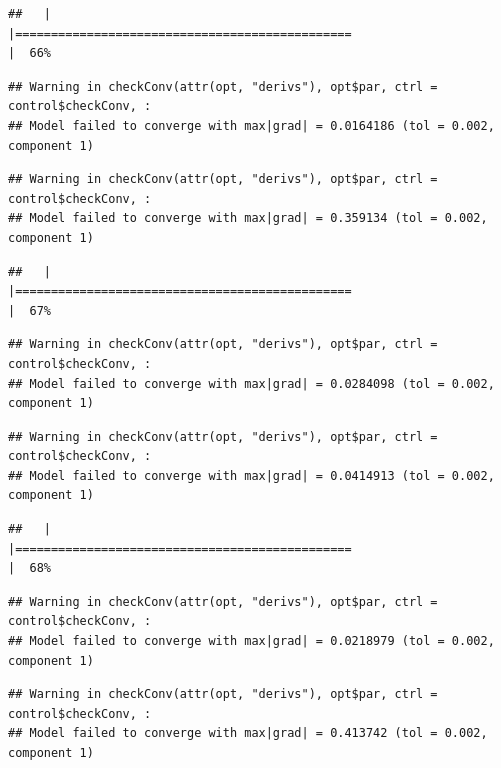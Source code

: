 \documentclass[
  12pt,
]{book}
\begin{document}
\begin{verbatim}
##   |                                                                              |===============================================                       |  66%
\end{verbatim}

\begin{verbatim}
## Warning in checkConv(attr(opt, "derivs"), opt$par, ctrl = control$checkConv, :
## Model failed to converge with max|grad| = 0.0164186 (tol = 0.002, component 1)
\end{verbatim}

\begin{verbatim}
## Warning in checkConv(attr(opt, "derivs"), opt$par, ctrl = control$checkConv, :
## Model failed to converge with max|grad| = 0.359134 (tol = 0.002, component 1)
\end{verbatim}

\begin{verbatim}
##   |                                                                              |===============================================                       |  67%
\end{verbatim}

\begin{verbatim}
## Warning in checkConv(attr(opt, "derivs"), opt$par, ctrl = control$checkConv, :
## Model failed to converge with max|grad| = 0.0284098 (tol = 0.002, component 1)
\end{verbatim}

\begin{verbatim}
## Warning in checkConv(attr(opt, "derivs"), opt$par, ctrl = control$checkConv, :
## Model failed to converge with max|grad| = 0.0414913 (tol = 0.002, component 1)
\end{verbatim}

\begin{verbatim}
##   |                                                                              |===============================================                       |  68%
\end{verbatim}

\begin{verbatim}
## Warning in checkConv(attr(opt, "derivs"), opt$par, ctrl = control$checkConv, :
## Model failed to converge with max|grad| = 0.0218979 (tol = 0.002, component 1)
\end{verbatim}

\begin{verbatim}
## Warning in checkConv(attr(opt, "derivs"), opt$par, ctrl = control$checkConv, :
## Model failed to converge with max|grad| = 0.413742 (tol = 0.002, component 1)
\end{verbatim}
\end{document}
